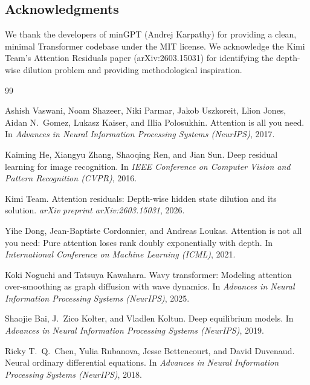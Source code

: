 \documentclass[10pt]{article}
\begin{document}
\subsection*{Acknowledgments}

We thank the developers of minGPT (Andrej Karpathy) for providing a clean, minimal Transformer codebase under the MIT license. We acknowledge the Kimi Team's Attention Residuals paper (arXiv:2603.15031) for identifying the depth-wise dilution problem and providing methodological inspiration.

\begin{thebibliography}{99}

Ashish Vaswani, Noam Shazeer, Niki Parmar, Jakob Uszkoreit, Llion Jones, Aidan N.~Gomez, Lukasz Kaiser, and Illia Polosukhin.
\newblock Attention is all you need.
\newblock In \emph{Advances in Neural Information Processing Systems (NeurIPS)}, 2017.

Kaiming He, Xiangyu Zhang, Shaoqing Ren, and Jian Sun.
\newblock Deep residual learning for image recognition.
\newblock In \emph{IEEE Conference on Computer Vision and Pattern Recognition (CVPR)}, 2016.

Kimi Team.
\newblock Attention residuals: Depth-wise hidden state dilution and its solution.
\newblock \emph{arXiv preprint arXiv:2603.15031}, 2026.

Yihe Dong, Jean-Baptiste Cordonnier, and Andreas Loukas.
\newblock Attention is not all you need: Pure attention loses rank doubly exponentially with depth.
\newblock In \emph{International Conference on Machine Learning (ICML)}, 2021.

Koki Noguchi and Tatsuya Kawahara.
\newblock Wavy transformer: Modeling attention over-smoothing as graph diffusion with wave dynamics.
\newblock In \emph{Advances in Neural Information Processing Systems (NeurIPS)}, 2025.

Shaojie Bai, J.~Zico Kolter, and Vladlen Koltun.
\newblock Deep equilibrium models.
\newblock In \emph{Advances in Neural Information Processing Systems (NeurIPS)}, 2019.

Ricky T.~Q.~Chen, Yulia Rubanova, Jesse Bettencourt, and David Duvenaud.
\newblock Neural ordinary differential equations.
\newblock In \emph{Advances in Neural Information Processing Systems (NeurIPS)}, 2018.


\end{thebibliography}
\end{document}
